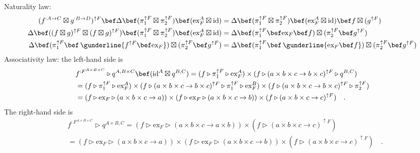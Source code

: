Naturality law:
\begin{align*}
(f^{:A\rightarrow C}\boxtimes g^{:B\rightarrow D})^{\uparrow F}\bef\Delta\bef(\pi_{1}^{\uparrow F}\boxtimes\pi_{2}^{\uparrow F})\bef(\text{ex}_{F}^{A}\boxtimes\text{id}) & =\Delta\bef(\pi_{1}^{\uparrow F}\boxtimes\pi_{2}^{\uparrow F})\bef(\text{ex}_{F}^{A}\boxtimes\text{id})\bef f\boxtimes(g^{\uparrow F})\\
\Delta\bef((f\boxtimes g)^{\uparrow F}\boxtimes(f\boxtimes g)^{\uparrow F})\bef(\pi_{1}^{\uparrow F}\boxtimes\pi_{2}^{\uparrow F})\bef(\text{ex}_{F}^{A}\boxtimes\text{id}) & =\Delta\bef(\pi_{1}^{\uparrow F}\bef\text{ex}_{F}\bef f)\boxtimes(\pi_{2}^{\uparrow F}\bef g^{\uparrow F})\\
\Delta\bef(\pi_{1}^{\uparrow F}\bef\,\gunderline{f^{\uparrow F}\bef\text{ex}_{F}})\boxtimes(\pi_{2}^{\uparrow F}\bef g^{\uparrow F}) & =\Delta\bef(\pi_{1}^{\uparrow F}\bef\,\gunderline{\text{ex}_{F}\bef f})\boxtimes(\pi_{2}^{\uparrow F}\bef g^{\uparrow F})
\end{align*}
Associativity law: the left-hand side is
\begin{align*}
 & f^{:F^{A\times B\times C}}\triangleright q^{A,B\times C}\bef(\text{id}^{A}\boxtimes q^{B,C})=(f\triangleright\pi_{1}^{\uparrow F}\triangleright\text{ex}_{F}^{A})\times(f\triangleright(a\times b\times c\rightarrow b\times c)^{\uparrow F}\triangleright q^{B,C})\\
 & =(f\triangleright\pi_{1}^{\uparrow F}\triangleright\text{ex}_{F}^{A})\times(f\triangleright(a\times b\times c\rightarrow b\times c)^{\uparrow F}\triangleright\pi_{1}^{\uparrow F}\triangleright\text{ex}_{F}^{B})\times(f\triangleright(a\times b\times c\rightarrow b\times c)^{\uparrow F}\triangleright\pi_{2}^{\uparrow F})\\
 & =\left(f\triangleright\text{ex}_{F}\triangleright(a\times b\times c\rightarrow a)\right)\times\left(f\triangleright\text{ex}_{F}\triangleright(a\times b\times c\rightarrow b)\right)\times(f\triangleright(a\times b\times c\rightarrow c)^{\uparrow F})\quad.
\end{align*}
The right-hand side is
\begin{align*}
 & f^{:F^{A\times B\times C}}\triangleright q^{A\times B,C}=(f\triangleright\text{ex}_{F}\triangleright(a\times b\times c\rightarrow a\times b))\times(f\triangleright(a\times b\times c\rightarrow c)^{\uparrow F})\\
 & =\left(f\triangleright\text{ex}_{F}\triangleright(a\times b\times c\rightarrow a)\right)\times\left(f\triangleright\text{ex}_{F}\triangleright(a\times b\times c\rightarrow b)\right)\times(f\triangleright(a\times b\times c\rightarrow c)^{\uparrow F})\quad.
\end{align*}


